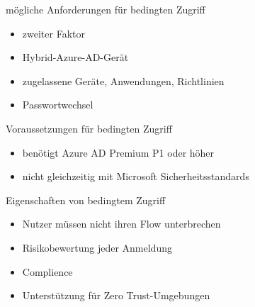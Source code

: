 \begin{flashcard}[Definition]{mögliche Anforderungen für bedingten Zugriff}
  \begin{itemize}
    \item zweiter Faktor
    \item Hybrid-Azure-AD-Gerät
    \item zugelassene Geräte, Anwendungen, Richtlinien
    \item Passwortwechsel
  \end{itemize}
\end{flashcard}

\begin{flashcard}[Definition]{Voraussetzungen für bedingten Zugriff}
  \begin{itemize}
    \item benötigt Azure AD Premium P1 oder höher
    \item nicht gleichzeitig mit Microsoft Sicherheitsstandards
  \end{itemize}
\end{flashcard}

\begin{flashcard}[Definition]{Eigenschaften von bedingtem Zugriff}
  \begin{itemize}
    \item Nutzer müssen nicht ihren Flow unterbrechen
    \item Risikobewertung jeder Anmeldung
    \item Complience
    \item Unterstützung für Zero Trust-Umgebungen
  \end{itemize}
\end{flashcard}

